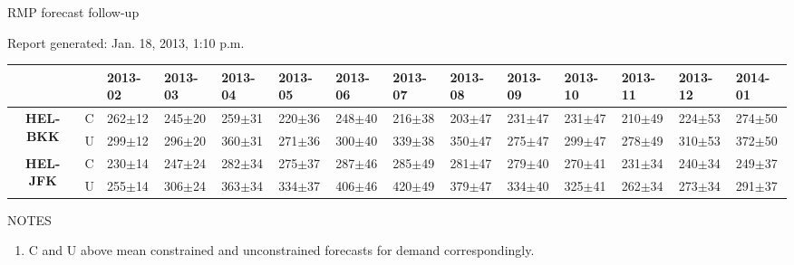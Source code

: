 \documentclass[8pt]{article}
\begin{document}
\thispagestyle{empty}

\renewcommand\arraystretch{0.9}

\noindent
\Large RMP forecast follow-up \normalsize

\vspace{10pt}
\noindent
Report generated: Jan. 18, 2013, 1:10 p.m.

\noindent
\begin{longtable}{c|p{0.2cm}|p{1cm}p{1cm}p{1cm}p{1cm}p{1cm}p{1cm}p{1cm}p{1cm}p{1cm}p{1cm}p{1cm}p{1cm}}
 \scriptsize & \scriptsize 

 & \scriptsize 2013-02

 & \scriptsize 2013-03

 & \scriptsize 2013-04

 & \scriptsize 2013-05

 & \scriptsize 2013-06

 & \scriptsize 2013-07

 & \scriptsize 2013-08

 & \scriptsize 2013-09

 & \scriptsize 2013-10

 & \scriptsize 2013-11

 & \scriptsize 2013-12

 & \scriptsize 2014-01

\\
\hline


\multirow{2}{*}{\scriptsize \bf HEL-BKK } & \scriptsize C    &\scriptsize 262$\pm$12 &\scriptsize 245$\pm$20 &\scriptsize 259$\pm$31 &\scriptsize 220$\pm$36 &\scriptsize 248$\pm$40 &\scriptsize 216$\pm$38 &\scriptsize 203$\pm$47 &\scriptsize 231$\pm$47 &\scriptsize 231$\pm$47 &\scriptsize 210$\pm$49 &\scriptsize 224$\pm$53 &\scriptsize 274$\pm$50 \\ 
                                              & \scriptsize U  &\scriptsize 299$\pm$12 &\scriptsize 296$\pm$20 &\scriptsize 360$\pm$31 &\scriptsize 271$\pm$36 &\scriptsize 300$\pm$40 &\scriptsize 339$\pm$38 &\scriptsize 350$\pm$47 &\scriptsize 275$\pm$47 &\scriptsize 299$\pm$47 &\scriptsize 278$\pm$49 &\scriptsize 310$\pm$53 &\scriptsize 372$\pm$50 \\
\hline

\multirow{2}{*}{\scriptsize \bf HEL-JFK } & \scriptsize C    &\scriptsize 230$\pm$14 &\scriptsize 247$\pm$24 &\scriptsize 282$\pm$34 &\scriptsize 275$\pm$37 &\scriptsize 287$\pm$46 &\scriptsize 285$\pm$49 &\scriptsize 281$\pm$47 &\scriptsize 279$\pm$40 &\scriptsize 270$\pm$41 &\scriptsize 231$\pm$34 &\scriptsize 240$\pm$34 &\scriptsize 249$\pm$37 \\ 
                                              & \scriptsize U  &\scriptsize 255$\pm$14 &\scriptsize 306$\pm$24 &\scriptsize 363$\pm$34 &\scriptsize 334$\pm$37 &\scriptsize 406$\pm$46 &\scriptsize 420$\pm$49 &\scriptsize 379$\pm$47 &\scriptsize 334$\pm$40 &\scriptsize 325$\pm$41 &\scriptsize 262$\pm$34 &\scriptsize 273$\pm$34 &\scriptsize 291$\pm$37 \\
\hline

\end{longtable}

\noindent
\large NOTES \normalsize
\begin{enumerate}
 \item C and U above mean constrained and unconstrained forecasts for demand correspondingly.
\end{enumerate}

\noindent
\end{document}
